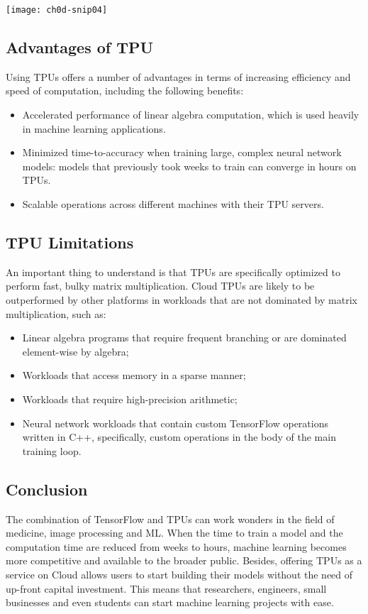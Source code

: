 {\centering \texttt{[image: ch0d-snip04]} \par}

\subsection{Advantages of TPU}

Using TPUs offers a number of advantages in terms of increasing efficiency and speed of computation, including the following benefits:
\begin{itemize}
\item     Accelerated performance of linear algebra computation, which is used heavily in machine learning applications.
\item      Minimized time-to-accuracy when training large, complex neural network models: models that previously took weeks to train can converge in hours on TPUs.
\item      Scalable operations across different machines with their TPU servers.
\end{itemize}


\subsection{TPU Limitations}

An important thing to understand is that TPUs are specifically optimized to perform fast, bulky matrix multiplication. Cloud TPUs are likely to be outperformed by other platforms in workloads that are not dominated by matrix multiplication, such as:

\begin{itemize}
\item     Linear algebra programs that require frequent branching or are dominated element-wise by algebra;
\item     Workloads that access memory in a sparse manner;
\item     Workloads that require high-precision arithmetic;
\item     Neural network workloads that contain custom TensorFlow operations written in C++, specifically, custom operations in the body of the main training loop.
\end{itemize}

\subsection{Conclusion}

The combination of TensorFlow and TPUs can work wonders in the field of medicine, image processing and ML. When the time to train a model and the computation time are reduced from weeks to hours, machine learning becomes more competitive and available to the broader public. Besides, offering TPUs as a service on Cloud allows users to start building their models without the need of up-front capital investment. This means that researchers, engineers, small businesses and even students can start machine learning projects with ease.
